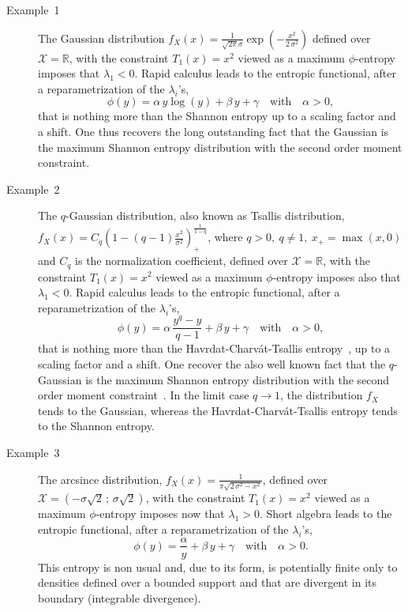 \documentclass[english,sort&compress]{elsarticle}
\theoremstyle{definition}
\theoremstyle{plain}
\theoremstyle{plain}
\def\Rset{\mathbb{R}}
\def\X{\mathcal{X}}
\begin{document}
{\begin{description}%
\item[Example~1]  The  Gaussian  distribution  $f_X(x) =  \frac{1}{\sqrt{2  \pi}
    \sigma} \exp\left( -  \frac{x^2}{2 \, \sigma^2} \right)$ defined  over $\X =
  \Rset$, with the constraint $T_1(x)  = x^2$ viewed as a maximum $\phi$-entropy
  imposes  that  $\lambda_1  <  0$.    Rapid  calculus  leads  to  the  entropic
  functional, after a reparametrization of the $\lambda_i$'s, $$\phi(y) = \alpha
  \, y \log(y) + \beta \, y  + \gamma \quad \mbox{with} \quad \alpha > 0,$$ that
  is  nothing more  than  the  Shannon entropy  up  to a  scaling  factor and  a
  shift. One  thus recovers the  long outstanding fact  that the Gaussian  is the
  maximum Shannon entropy distribution with the second order moment constraint.
%
\item[Example~2]   The  $q$-Gaussian   distribution,  also   known   as  Tsallis
  distribution,   $f_X(x)  =   C_q   \left(  1   -  (q-1)   \frac{x^2}{\sigma^2}
  \right)_+^{\frac{1}{1-q}}$, where $q > 0, \:  q \ne 1, \: x_+ = \max(x,0)$ and
  $C_q$ is  the normalization coefficient, defined  over $\X =  \Rset$, with the
  constraint $T_1(x) = x^2$ viewed as a maximum $\phi$-entropy imposes also that
  $\lambda_1 <  0$.  Rapid  calculus leads to  the entropic functional,  after a
  reparametrization    of   the   $\lambda_i$'s,    $$\phi(y)   =    \alpha   \,
  \frac{y^q-y}{q-1} + \beta \, y +  \gamma \quad \mbox{with} \quad \alpha > 0,$$
  that     is     nothing     more    than     the     Havrdat-Charv\'at-Tsallis
  entropy~\cite{HavCha67, Dar70, Tsa88, CosHer03}, up  to a scaling factor and a
  shift.  One recover  the also  well known  fact that  the $q$-Gaussian  is the
  maximum   Shannon  entropy   distribution   with  the   second  order   moment
  constraint~\cite{CosHer03}.  In the  limit case  $q \to  1$,  the distribution
  $f_X$  tends to  the Gaussian,  whereas the  Havrdat-Charv\'at-Tsallis entropy
  tends to the Shannon entropy.
%
\item[Example~3] The  arcsince distribution,  $f_X(x) = \frac{1}{\pi  \sqrt{2 \,
      \sigma^2 - x^2}}$, defined over $\X = \left( -\sigma \sqrt2 \, ; \, \sigma
    \sqrt2  \right)$, with the  constraint $T_1(x)  = x^2$  viewed as  a maximum
  $\phi$-entropy imposes  now that $\lambda_1 >  0$. Short algebra  leads to the
  entropic functional, after a reparametrization of the $\lambda_i$'s, $$\phi(y)
  = \frac{\alpha}{y} + \beta \, y + \gamma \quad \mbox{with} \quad \alpha > 0.$$
  This entropy is non usual and, due  to its form, is potentially finite only to
  densities  defined  over a  bounded  support and  that  are  divergent in  its
  boundary (integrable divergence).
\end{description}

  }
\end{document}
